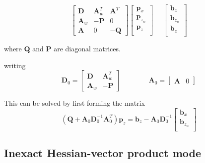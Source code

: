 \documentclass[12pt]{article}
\newcommand{\mb}{\mathbf}
\begin{document}
\begin{equation*}
	\begin{bmatrix} 
	\mb{D} &  \mb{A}_{w}^{T} & \mb{A}^{T} \\
	\mb{A}_{w} & -\mb{P}  & 0 \\
	\mb{A} & 0 & -\mb{Q} 
	\end{bmatrix}
	\begin{bmatrix}
	\mb{p}_{x} \\
	\mb{p}_{z_{w}} \\
	\mb{p}_{z} \\
	\end{bmatrix} = 
	\begin{bmatrix}
	\mb{b}_{x} \\
	\mb{b}_{z_{w}} \\
	\mb{b}_{z} \\
	\end{bmatrix}
\end{equation*}

where $\mb{Q}$ and $\mb{P}$ are diagonal matrices.

writing 
\begin{equation*}
	\mb{D}_{0} = \begin{bmatrix} \mb{D} & \mb{A}_{w}^{T} \\
	\mb{A}_{w} & - \mb{P} \end{bmatrix}
	\qquad\qquad
	\mb{A}_{0} = \begin{bmatrix} \mb{A} & 0 \end{bmatrix}
\end{equation*}

This can be solved by first forming the matrix
%
\begin{equation*}
	\left( \mb{Q} + \mb{A}_{0} \mb{D}_{0}^{-1} \mb{A}_{0}^{T} \right)  \mb{p}_{z} = \mb{b}_{z} - \mb{A}_{0} \mb{D}_{0}^{-1} \begin{bmatrix} 
	\mb{b}_{x} \\
	\mb{b}_{z_{w}} \\
	\end{bmatrix}
\end{equation*}


\subsection{Inexact Hessian-vector product mode}
\end{document}
